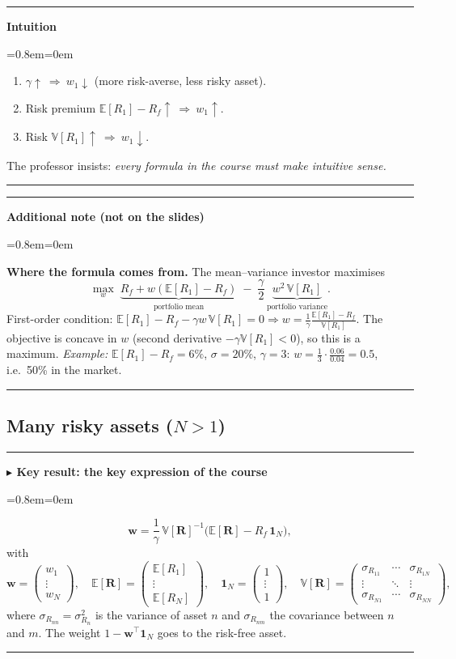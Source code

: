 \documentclass[11pt,a4paper]{report}
\newenvironment{notebox}[1]
  {\par\medskip\Needspace{6\baselineskip}\noindent\rule{\linewidth}{0.4pt}\par\nopagebreak
   \noindent\textbf{#1}\par\nopagebreak
   \begin{list}{}{\leftmargin=0.8em\rightmargin=0em\topsep=2pt}\item[]}
  {\end{list}\nopagebreak\noindent\rule{\linewidth}{0.4pt}\par\medskip}
\newenvironment{keybox}[1][]{\begin{notebox}{$\blacktriangleright$ Key result#1}}{\end{notebox}}
\newenvironment{intuition}{\begin{notebox}{Intuition}}{\end{notebox}}
\newenvironment{addnote}{\begin{notebox}{Additional note (not on the slides)}}{\end{notebox}}
\newcommand{\E}{\mathbb{E}}
\newcommand{\V}{\mathbb{V}}
\newcommand{\one}{\mathbf{1}_N}
\newcommand{\w}{\bm{w}}
\newcommand{\R}{\bm{R}}
\newcommand{\T}{^{\top}}
\newcommand{\Rf}{R_f}
\begin{document}
\begin{intuition}
\begin{enumerate}
  \item $\gamma\uparrow\ \Rightarrow\ w_1\downarrow$ (more risk-averse, less risky asset).
  \item Risk premium $\E[R_1]-\Rf\uparrow\ \Rightarrow\ w_1\uparrow$.
  \item Risk $\V[R_1]\uparrow\ \Rightarrow\ w_1\downarrow$.
\end{enumerate}
The professor insists: \emph{every formula in the course must make intuitive sense.}
\end{intuition}

\begin{addnote}
\textbf{Where the formula comes from.} The mean--variance investor maximises
\[
  \max_{w}\; \underbrace{\Rf + w(\E[R_1]-\Rf)}_{\text{portfolio mean}}
  \;-\; \frac{\gamma}{2}\,\underbrace{w^2\,\V[R_1]}_{\text{portfolio variance}}.
\]
First-order condition: $\E[R_1]-\Rf-\gamma w\,\V[R_1]=0 \Rightarrow
w=\frac{1}{\gamma}\frac{\E[R_1]-\Rf}{\V[R_1]}$. The objective is concave in
$w$ (second derivative $-\gamma\V[R_1]<0$), so this is a maximum.
\emph{Example:} $\E[R_1]-\Rf=6\%$, $\sigma=20\%$, $\gamma=3$:
$w=\frac{1}{3}\cdot\frac{0.06}{0.04}=0.5$, i.e.\ 50\% in the market.
\end{addnote}

\subsection{Many risky assets ($N>1$)}
\begin{keybox}[: the key expression of the course]
\[
  \w = \frac{1}{\gamma}\,\V[\R]^{-1}\big(\E[\R]-\Rf\,\one\big),
\]
with
\[
\w=\begin{pmatrix}w_1\\ \vdots\\ w_N\end{pmatrix},\quad
\E[\R]=\begin{pmatrix}\E[R_1]\\ \vdots\\ \E[R_N]\end{pmatrix},\quad
\one=\begin{pmatrix}1\\ \vdots\\ 1\end{pmatrix},\quad
\V[\R]=\begin{pmatrix}
\sigma_{R_{11}} & \cdots & \sigma_{R_{1N}}\\
\vdots & \ddots & \vdots\\
\sigma_{R_{N1}} & \cdots & \sigma_{R_{NN}}
\end{pmatrix},
\]
where $\sigma_{R_{nn}}=\sigma^2_{R_n}$ is the variance of asset $n$ and
$\sigma_{R_{nm}}$ the covariance between $n$ and $m$. The weight $1-\w\T\one$
goes to the risk-free asset.
\end{keybox}
\end{document}
